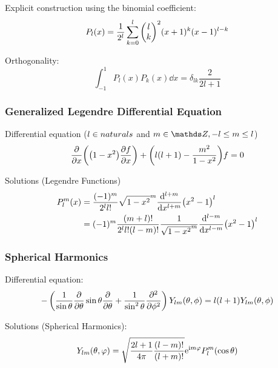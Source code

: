 			\noindent
			Explicit construction using the binomial coefficient:
			\begin{equation}
				P_l(x)=\frac{1}{2^l} \sum_{k=0}^{l}\binomkoeff{l}{k}^2(x+1)^k(x-1)^{l-k}
			\end{equation}

			\noindent
			Orthogonality:
			\begin{equation}
				\int_{-1}^1 P_l(x) P_k(x)\dd{x} = \delta_{lk} \frac{2}{2l+1}
			\end{equation}

		\subsubsection{Generalized Legendre Differential Equation}
			\noindent
			Differential equation ($l\in\\naturals $ and $m\in\integers, -l\le m\le l$)
			\begin{equation}
				\pdv{x}\qty(\qty(1-x^2)\pdv{f}{x})+\qty(l\qty(l+1)-\frac{m^2}{1-x^2})f= 0
			\end{equation}

			\noindent
			Solutions (Legendre Functions)
			\begin{equation}
				\begin{aligned}
					P_l^m(x) &= \frac{(-1)^m}{2^l l!}\sqrt{1-x^2}^m
					\dv[l+m]{x}\qty(x^2-1)^l \\
					&= (-1)^m \frac{(m+l)!}{2^l l! (l-m)!}\frac{1}{\sqrt{1-x^2}^m}
					\dv[l-m]{x}\qty(x^2-1)^l \\
				\end{aligned}
			\end{equation}

		\subsubsection{Spherical Harmonics}
			\noindent
			Differential equation:
			\begin{equation}
				-\left(
				\frac{1}{\sin\theta}\pdv{\theta}\sin\theta\pdv{\theta} + \frac{1}{\sin^2\theta}\frac{\partial^2}{\partial \phi^2}
				\right)
				Y_{lm}(\theta,\phi) = l(l+1)Y_{lm}(\theta,\phi)
			\end{equation}

			\noindent
			Solutions (Spherical Harmonics):
			\begin{equation} \label{Eq:SphericalHarmonics}
				Y_{lm}(\theta,\varphi) = \sqrt{\frac{2l+1}{4\pi}\frac{(l-m)!}{(l+m)!}} \mathrm{e}^{\mathrm{i} m\varphi} P_l^m(\cos\theta)
			\end{equation}

